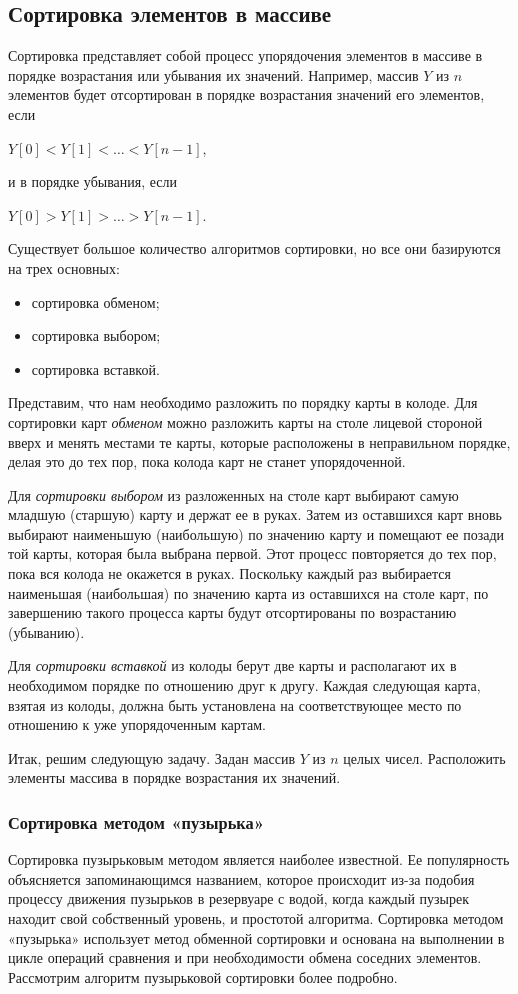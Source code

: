 \subsection[Сортировка элементов в массиве]{Сортировка элементов в массиве}
Сортировка представляет собой процесс упорядочения элементов в массиве в
порядке возрастания или убывания их значений. Например, массив $Y$ из $n$ элементов
будет отсортирован в порядке возрастания значений его элементов, если

 $Y[0]<Y[1]<{\dots}<Y[n-1]$,

и в порядке убывания, если

 $Y[0]>Y[1]>{\dots}>Y[n-1]$.

Существует большое количество алгоритмов сортировки, но все они базируются на трех основных:

\begin{itemize}
\item сортировка обменом;
\item сортировка выбором;
\item сортировка вставкой.
\end{itemize}
Представим, что нам необходимо разложить по порядку карты в колоде. Для сортировки карт \emph{обменом} можно разложить
карты на столе лицевой стороной вверх и менять местами те карты, которые расположены в неправильном порядке, делая это
до тех пор, пока колода карт не станет упорядоченной.

Для \emph{сортировки выбором} из разложенных на столе карт выбирают самую младшую (старшую) карту и держат ее в руках.
Затем из оставшихся карт вновь выбирают наименьшую (наибольшую) по значению карту и помещают ее позади той карты,
которая была выбрана первой. Этот процесс повторяется до тех пор, пока вся колода не окажется в руках. Поскольку каждый
раз выбирается наименьшая (наибольшая) по значению карта из оставшихся на столе карт, по завершению такого процесса
карты будут отсортированы по возрастанию (убыванию).

Для \emph{сортировки вставкой} из колоды берут две карты и располагают их в необходимом порядке по отношению друг к
другу. Каждая следующая карта, взятая из колоды, должна быть установлена на соответствующее место по отношению к уже
упорядоченным картам.

Итак, решим следующую задачу. Задан массив $Y$ из $n$ целых чисел. Расположить элементы массива в порядке возрастания их
значений.

\subsubsection[Сортировка методом «пузырька»]{Сортировка методом «пузырька»}
Сортировка пузырьковым методом является наиболее известной. Ее популярность объясняется запоминающимся названием,
которое происходит из-за подобия процессу движения пузырьков в резервуаре с водой, когда каждый пузырек находит свой
собственный уровень, и простотой алгоритма. Сортировка методом «пузырька» использует метод обменной сортировки и
основана на выполнении в цикле операций сравнения и при необходимости обмена соседних элементов. Рассмотрим алгоритм
пузырьковой сортировки более подробно.

